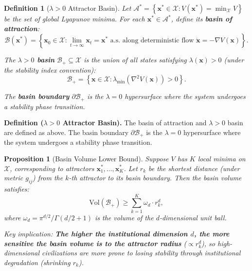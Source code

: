\documentclass[12pt,a4paper]{article}
\newtheorem{proposition}[theorem]{Proposition}
\newtheorem{definition}[theorem]{Definition}
\theoremstyle{definition}
\newcommand{\set}[1]{\left\{#1\right\}}
\newcommand{\calB}{\mathcal{B}}
\newcommand{\calA}{\mathcal{A}}
\newcommand{\calX}{\mathcal{X}}
\newcommand{\lb}{\lambda}
\newcommand{\lambdamin}{\lambda_{\min}}
\newcommand{\Lyap}{V}
\newcommand{\grad}{\nabla}
\begin{document}
\begin{definition}[$\lb>0$ Attractor Basin]
\label{def:basin}
Let $\calA^* = \set{\mathbf{x}^* \in \calX : \Lyap(\mathbf{x}^*) = \min_{\calX} \Lyap}$ be the set of global Lyapunov minima. For each $\mathbf{x}^* \in \calA^*$, define its \textbf{basin of attraction}:
\begin{equation}\label{eq:basin_def}
    \calB(\mathbf{x}^*) = \set{\mathbf{x}_0 \in \calX : \lim_{t \to \infty} \mathbf{x}_t = \mathbf{x}^* \text{ a.s. along deterministic flow } \dot{\mathbf{x}} = -\grad \Lyap(\mathbf{x})}.
\end{equation}

The \textbf{$\lb>0$ basin} $\calB_{+} \subseteq \calX$ is the union of all states satisfying $\lb(\mathbf{x}) > 0$ (under the stability index convention):
\begin{equation}\label{eq:basin_plus}
    \calB_{+} = \set{\mathbf{x} \in \calX : \lambdamin(\nabla^2 \Lyap(\mathbf{x})) > 0}.
\end{equation}

The \textbf{basin boundary} $\partial \calB_{+}$ is the $\lb=0$ hypersurface where the system undergoes a stability phase transition.
\end{definition}

\noindent
\textbf{Definition ($\lb>0$ Attractor Basin).}
The basin of attraction and $\lb>0$ basin are defined as above. The basin boundary $\partial \calB_{+}$ is the $\lb=0$ hypersurface where the system undergoes a stability phase transition.

\begin{proposition}[Basin Volume Lower Bound]
\label{prop:basin_volume}
Suppose $\Lyap$ has $K$ local minima on $\calX$, corresponding to attractors $\mathbf{x}^*_1, \ldots, \mathbf{x}^*_K$. Let $r_k$ be the shortest distance (under metric $g_{ij}$) from the $k$-th attractor to its basin boundary. Then the basin volume satisfies:
\begin{equation}\label{eq:basin_vol}
    \mathrm{Vol}(\calB_{+}) \geq \sum_{k=1}^{K} \omega_d \cdot r_k^d,
\end{equation}
where $\omega_d = \pi^{d/2} / \Gamma(d/2 + 1)$ is the volume of the $d$-dimensional unit ball.

Key implication: \textbf{The higher the institutional dimension $d$, the more sensitive the basin volume is to the attractor radius} ($\propto r_k^d$), so high-dimensional civilizations are more prone to losing stability through institutional degradation (shrinking $r_k$).
\end{proposition}
\end{document}
